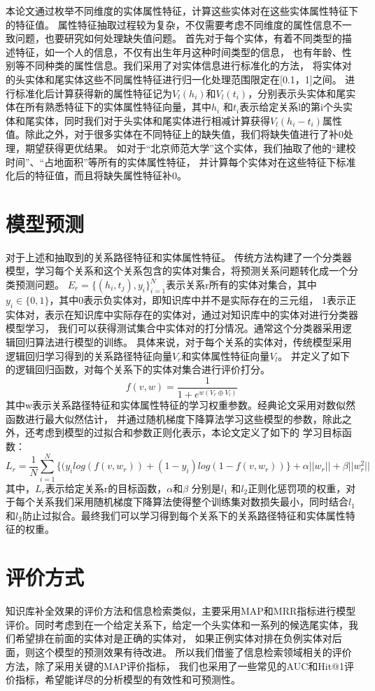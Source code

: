 本论文通过枚举不同维度的实体属性特征，计算这些实体对在这些实体属性特征下的特征值。
属性特征抽取过程较为复杂，不仅需要考虑不同维度的属性信息不一致问题，也要研究如何处理缺失值问题。
首先对于每个实体，有着不同类型的描述特征，如一个人的信息，不仅有出生年月这种时间类型的信息，
也有年龄、性别等不同种类的属性信息。我们采用了对实体信息进行标准化的方法，
将实体对的头实体和尾实体这些不同属性特征进行归一化处理范围限定在[0.1，1]之间。
进行标准化后计算获得新的属性特征记为$V_l(h_i)$和$V_l (t_i)$，分别表示头实体和尾实体在所有熟悉特征下的实体属性特征向量，其中$h_i$ 和$t_i$表示给定关系l的第i个头实体和尾实体，同时我们对于头实体和尾实体进行相减计算获得$V_l(h_i-t_i )$属性值。除此之外，对于很多实体在不同特征上的缺失值，我们将缺失值进行了补0处理，期望获得更优结果。
如对于“北京师范大学”这个实体，我们抽取了他的“建校时间”、“占地面积”等所有的实体属性特征，
并计算每个实体对在这些特征下标准化后的特征值，而且将缺失属性特征补0。

\section{模型预测}
对于上述\label{sec:literal}和\label{sec:relational}抽取到的关系路径特征和实体属性特征。
传统方法构建了一个分类器模型，学习每个关系和这个关系包含的实体对集合，将预测关系问题转化成一个分类预测问题。
$E_r=\{(h_i,t_j),y_i\}^N_{i=1} $表示关系r所有的实体对集合，其中$y_i\in \{0,1\}$，其中0表示负实体对，即知识库中并不是实际存在的三元组，
1表示正实体对，表示在知识库中实际存在的实体对，通过对知识库中的实体对进行分类器模型学习，
我们可以获得测试集合中实体对的打分情况。通常这个分类器采用逻辑回归算法进行模型的训练。
具体来说，对于每个关系的实体对，传统模型采用逻辑回归学习得到的关系路径特征向量$V_r$和实体属性特征向量$V_l$。
并定义了如下的逻辑回归函数，对每个关系下的实体对集合进行评价打分。
$$f(v,w)=\frac{1}{1+e^{w(V_r \oplus  V_l)}}$$
其中w表示关系路径特征和实体属性特征的学习权重参数。经典论文采用对数似然函数进行最大似然估计，
并通过随机梯度下降算法学习这些模型的参数，除此之外，还考虑到模型的过拟合和参数正则化表示，本论文定义了如下的
学习目标函数：
$$L_r=\frac{1}{N}\sum_{i=1}^N\{(y_ilog(f(v,w_r)) + (1-y_i)log(1-f(v,w_r))\}+\alpha ||w_r||+\beta||w_r^2||$$
其中，$L_r$表示给定关系r的目标函数，$\alpha$和$\beta$ 分别是$l_1$ 和$l_2$正则化惩罚项的权重，对于每个关系我们采用随机梯度下降算法使得整个训练集对数损失最小，同时结合$l_1$ 和$l_2$防止过拟合。最终我们可以学习得到每个关系下的关系路径特征和实体属性特征的权重。


\section{评价方式}
\label{sec:metrics}
知识库补全效果的评价方法和信息检索类似，主要采用MAP和MRR\cite{Gardner2014}指标进行模型评价。同时考虑到在一个给定关系下，给定一个头实体和一系列的候选尾实体，我们希望排在前面的实体对是正确的实体对，
如果正例实体对排在负例实体对后面，则这个模型的预测效果有待改进。
所以我们借鉴了信息检索领域相关的评价方法，除了采用关键的MAP评价指标，
我们也采用了一些常见的AUC和Hit@1评价指标，希望能详尽的分析模型的有效性和可预测性。

